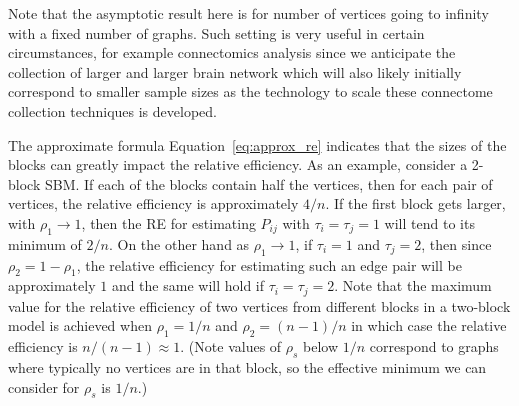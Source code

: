 Note that the asymptotic result here is for number of vertices going to infinity with a fixed number of graphs. Such setting is very useful in certain circumstances, for example connectomics analysis since we anticipate the collection of larger and larger brain network which will also likely initially correspond to smaller sample sizes as the technology to scale these connectome collection techniques is developed.

The approximate formula Equation~\ref{eq:approx_re} indicates that the sizes of the blocks can greatly impact the relative efficiency.
As an example, consider a 2-block SBM. 
If each of the blocks contain half the vertices, then for each pair of vertices, the relative efficiency is approximately $4/n$. 
If the first block gets larger, with $\rho_1\to 1$, then the RE for estimating $P_{ij}$ with $\tau_i=\tau_j=1$ will tend to its minimum of $2/n$. 
On the other hand as $\rho_1\to 1$, if $\tau_i=1$ and $\tau_j=2$, then since $\rho_2=1-\rho_1$, the relative efficiency for estimating such an edge pair will be approximately $1$ and the same will hold if $\tau_i=\tau_j=2$.
Note that the maximum value for the relative efficiency of two vertices from different blocks in a two-block model is achieved when $\rho_1=1/n$ and $\rho_2=(n-1)/n$ in which case the relative efficiency is $n/(n-1) \approx 1$.
(Note values of $\rho_s$ below $1/n$ correspond to graphs where typically no vertices are in that block, so the effective minimum we can consider for $\rho_s$ is $1/n$.)

